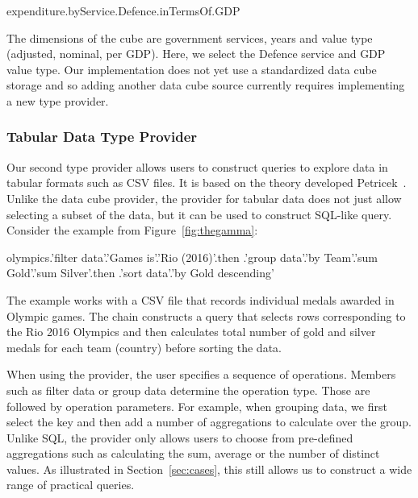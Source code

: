 \documentclass[manuscript,review,anonymous]{acmart}
\newcommand{\ikvd}[1]{{\fontfamily{zi4}\selectfont\small #1}}
\begin{document}
\begin{thegamma}
expenditure.byService.Defence.inTermsOf.GDP
\end{thegamma}

The dimensions of the cube are government services, years and value type (adjusted, nominal,
per GDP). Here, we select the \ikvd{Defence} service and \ikvd{GDP} value type. Our implementation
does not yet use a standardized data cube storage and so adding another data cube source
currently requires implementing a new type provider.

\subsubsection*{Tabular Data Type Provider}

Our second type provider allows users to construct queries to explore data in tabular formats
such as CSV files. It is based on the theory developed Petricek~\cite{dotdriven}. Unlike the  %
data cube provider, the provider for tabular data does not just allow selecting a subset of the
data, but it can be used to construct SQL-like query. Consider the example from Figure~\ref{fig:thegamma}:

\begin{thegamma}
olympics.'filter data'.'Games is'.'Rio (2016)'.then
  .'group data'.'by Team'.'sum Gold'.'sum Silver'.then
  .'sort data'.'by Gold descending'
\end{thegamma}

The example works with a CSV file that records individual medals awarded in Olympic games.
The chain constructs a query that selects rows corresponding to the Rio 2016 Olympics and then
calculates total number of gold and silver medals for each team (country) before sorting the data.

When using the provider, the user specifies a sequence of operations. Members such as
\ikvd{\textquotesingle filter data\textquotesingle} or \ikvd{\textquotesingle group data\textquotesingle}
determine the operation type. Those are followed by operation parameters. For example, when grouping
data, we first select the key and then add a number of aggregations to calculate over the group.
Unlike SQL, the provider only allows users to choose from pre-defined aggregations such as
calculating the sum, average or the number of distinct values. As illustrated in
Section~\ref{sec:cases}, this still allows us to construct a wide range of practical queries.
\end{document}

